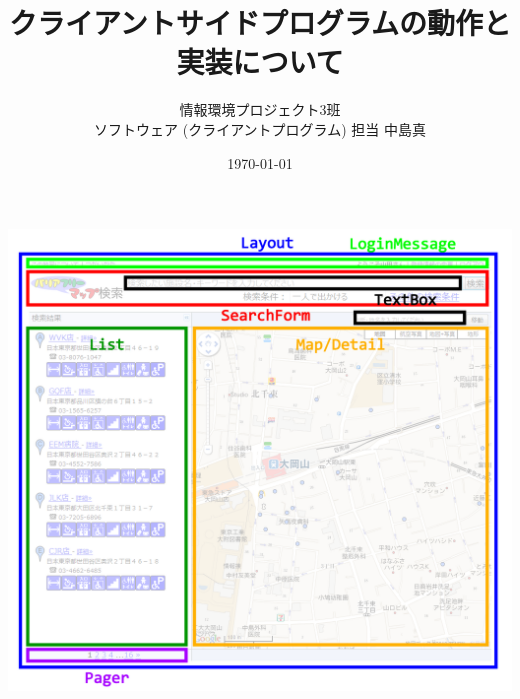 \documentclass[a4paper]{jsarticle}
\title{クライアントサイドプログラムの動作と実装について}
\author{情報環境プロジェクト3班 \\
ソフトウェア (クライアントプログラム) 担当 中島真}
\date{\today}
\begin{document}
\maketitle
\includegraphics[width=0.8\linewidth]{../../image/display/structure}
\end{document}
